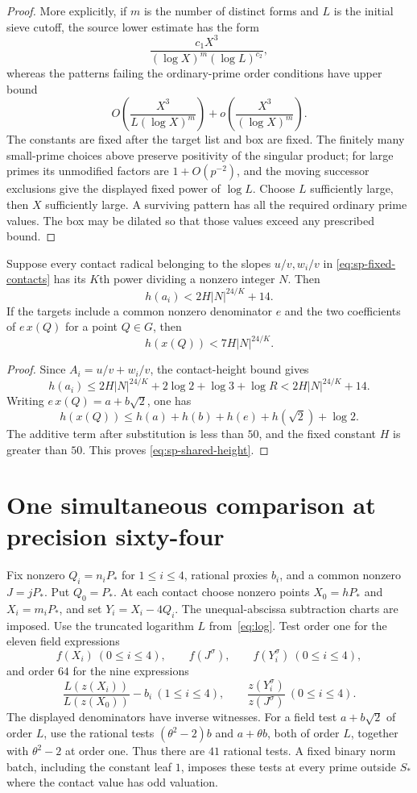 \begin{proof}
More explicitly, if $m$ is the number of distinct forms and $L$ is
the initial sieve cutoff, the source lower estimate has the form
\[
 \frac{c_1 X^3}{(\log X)^m(\log L)^{c_2}},
\]
whereas the patterns failing the ordinary-prime order conditions have
upper bound
\[
 O\!\left(\frac{X^3}{L(\log X)^m}\right)
       +o\!\left(\frac{X^3}{(\log X)^m}\right).
\]
The constants are fixed after the target list and box are fixed.
The finitely many small-prime choices above preserve positivity of the
singular product; for large primes its unmodified factors are
$1+O(p^{-2})$, and the moving successor exclusions give the displayed
fixed power of $\log L$. Choose $L$ sufficiently large, then $X$
sufficiently large. A surviving pattern has all the required ordinary
prime values. The box may be dilated so that those values exceed any
prescribed bound.
\end{proof}

\begin{lemma}\label{lem:sp-shared-height}
Suppose every contact radical belonging to the slopes $u/v,w_i/v$
in \eqref{eq:sp-fixed-contacts} has its $K$th power dividing a nonzero
integer $N$. Then
\[
 h(a_i)<2H|N|^{24/K}+14.
\]
If the targets include a common nonzero denominator $e$ and the two
coefficients of $e\,x(Q)$ for a point $Q\in G$, then
\begin{equation}\label{eq:sp-shared-height}
 h(x(Q))<7H|N|^{24/K}.
\end{equation}
\end{lemma}
\begin{proof}
Since $A_i=u/v+w_i/v$, the contact-height bound gives
\[
 h(a_i)\le2H|N|^{24/K}+2\log2+\log3+\log R
         <2H|N|^{24/K}+14.
\]
Writing $e\,x(Q)=a+b\sqrt2$, one has
\[
 h(x(Q))\le h(a)+h(b)+h(e)+h(\sqrt2)+\log2.
\]
The additive term after substitution is less than $50$, and the fixed
constant $H$ is greater than $50$. This proves
\eqref{eq:sp-shared-height}.
\end{proof}

\section{One simultaneous comparison at precision sixty-four}
\label{sec:sp-comparison}

Fix nonzero $Q_i=n_iP_*$ for $1\le i\le4$, rational proxies $b_i$,
and a common nonzero $J=jP_*$. Put $Q_0=P_*$. At each contact choose
nonzero points $X_0=hP_*$ and $X_i=m_iP_*$, and set $Y_i=X_i-4Q_i$.
The unequal-abscissa subtraction charts are imposed. Use the truncated logarithm $L$ from~\eqref{eq:log}.
Test order one for the eleven field expressions
\[
 f(X_i)\ (0\le i\le4),\qquad f(J^\sigma),\qquad
 f(Y_i^\sigma)\ (0\le i\le4),
\]
and order $64$ for the nine expressions
\[
 \frac{L(z(X_i))}{L(z(X_0))}-b_i
       \ (1\le i\le4),\qquad
 \frac{z(Y_i^\sigma)}{z(J^\sigma)}\ (0\le i\le4).
\]
The displayed denominators have inverse witnesses. For a field test
$a+b\sqrt2$ of order $L$, use the rational tests
$(\theta^2-2)b$ and $a+\theta b$, both of order $L$, together
with $\theta^2-2$ at order one. Thus there are $41$ rational
tests. A fixed binary norm batch, including the constant leaf $1$,
imposes these tests at every prime outside $S_*$ where the contact
value has odd valuation.

